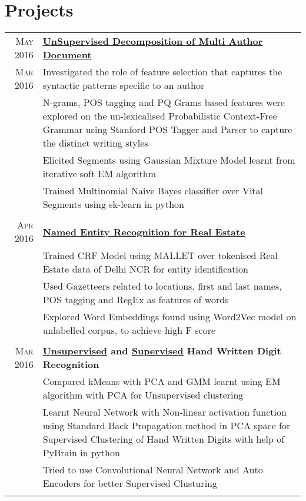 \documentclass[a4paper,10pt]{article}
\begin{document}
\section{Projects}
\begin{longtable}{r|p{16cm}}

 \textsc{May 2016} & \textbf{\href{https://github.com/kautsiitd/Unsupervised-Decomposition-of-a-Multi-Author-Document}{UnSupervised Decomposition of Multi Author Document}}\\ 
 \textsc{Mar 2016} & Investigated the role of feature selection that captures the syntactic patterns specific to an author\\
& N-grams, POS tagging and PQ Grams based features were explored on the un-lexicalised Probabilistic Context-Free Grammar using Stanford POS Tagger and Parser to capture the distinct writing styles\\
& Elicited Segments using Gaussian Mixture Model learnt from iterative soft EM algorithm\\
& Trained Multinomial Naive Bayes classifier over Vital Segments using sk-learn in python\\\multicolumn{2}{c}{}\\

\textsc{Apr 2016} & \textbf{\href{https://github.com/kautsiitd/NER-for-Real-Estate}{Named Entity Recognition for Real Estate}} \\
& Trained CRF Model using MALLET over tokenised Real Estate data of Delhi NCR for entity identification\\
& Used Gazetteers related to locations, first and last names, POS tagging and RegEx as features of words\\
& Explored Word Embeddings found using Word2Vec model on unlabelled corpus, to achieve high F score\\\multicolumn{2}{c}{}\\

\textsc{Mar 2016} & \textbf{\href{https://github.com/kautsiitd/Unsupervised-Hand-Written-Digit-Recognition}{Unsupervised} and \href{https://github.com/kautsiitd/Supervised-Hand-Written-Digit-Recognition}{Supervised} Hand Written Digit Recognition} \\
& Compared kMeans with PCA and GMM learnt using EM algorithm with PCA for Unsupervised clustering\\
& Learnt Neural Network with Non-linear activation function using Standard Back Propagation method in PCA space for Supervised Clustering of Hand Written Digits with help of PyBrain in python
\\
& Tried to use Convolutional Neural Network and Auto Encoders for better Supervised Clusturing\\\multicolumn{2}{c}{}\\


\end{longtable}
\end{document}
